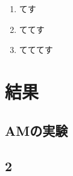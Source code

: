 \documentclass{jsarticle}
\begin{document}
\begin{enumerate}
  \item てす
  \item ててす
  \item てててす
\end{enumerate}



\section{結果}

\subsection{AMの実験}

\subsection{2}
\end{document}
